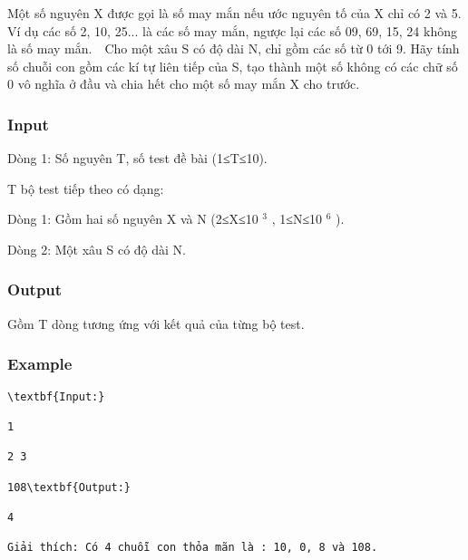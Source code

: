 



   Một số nguyên X được gọi là số may mắn nếu ước nguyên tố của X chỉ có 2 và 5. Ví dụ các số 2, 10, 25... là các số may mắn, ngược lại các số 09, 69, 15, 24 không là số may mắn.  Cho một xâu S có độ dài N, chỉ gồm các số từ 0 tới 9. Hãy tính số chuỗi con gồm các kí tự liên tiếp của S, tạo thành một số không có các chữ số 0 vô nghĩa ở đầu và chia hết cho một số may mắn X cho trước.  

\subsubsection{   Input  }

   Dòng 1: Số nguyên T, số test đề bài (1≤T≤10).  

   T bộ test tiếp theo có dạng:  

   Dòng 1: Gồm hai số nguyên X và N (2≤X≤10   $^    3   $   , 1≤N≤10   $^    6   $   ).  

   Dòng 2: Một xâu S có độ dài N.  

\subsubsection{   Output  }

   Gồm T dòng tương ứng với kết quả của từng bộ test.  

\subsubsection{   Example  }
\begin{verbatim}
\textbf{Input:}

1

2 3

108\textbf{Output:}

4

Giải thích: Có 4 chuỗi con thỏa mãn là : 10, 0, 8 và 108.\end{verbatim}